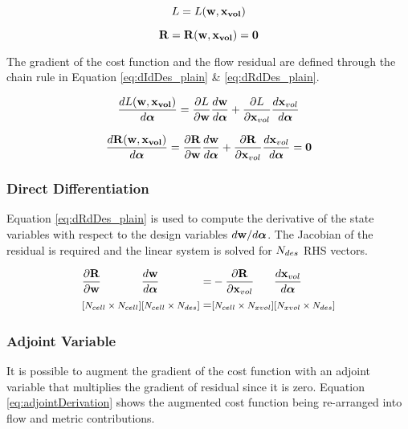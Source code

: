 \documentclass[letterpaper,12pt,]{article}
\begin{document}
\begin{equation}
	L = L(\mathbf{w}, \mathbf{x_{vol}})
	\label{eq:cost}
\end{equation}

\begin{equation}
	\mathbf{R} = \mathbf{R}(\mathbf{w}, \mathbf{x_{vol}}) = \mathbf{0}
	\label{eq:flowres}
\end{equation}

The gradient of the cost function and the flow residual are defined through the chain rule in Equation \ref{eq:dIdDes_plain} \& \ref{eq:dRdDes_plain}.

\begin{equation}
	\dfrac{dL( \mathbf{w}, \mathbf{x_{vol}} ) }{d\boldsymbol{\alpha}}
	= 
    \dfrac{\partial L}{\partial\mathbf{w}}
	\dfrac{d\mathbf{w}}{d\boldsymbol{\alpha}}
	+
	\dfrac{\partial L}{\partial\mathbf{x}_{vol}}
	\dfrac{d\mathbf{x}_{vol}}{d\boldsymbol{\alpha}}
	\label{eq:dIdDes_plain}
\end{equation}

\begin{equation}
	\dfrac{d\mathbf{R}( \mathbf{w}, \mathbf{x_{vol}} ) }{d\boldsymbol{\alpha}}
	= 
    \dfrac{\partial\mathbf{R}}{\partial\mathbf{w}}
	\dfrac{d\mathbf{w}}{d\boldsymbol{\alpha}}
	+
	\dfrac{\partial\mathbf{R}}{\partial\mathbf{x}_{vol}}
	\dfrac{d\mathbf{x}_{vol}}{d\boldsymbol{\alpha}}
	=
	\mathbf{0}
	\label{eq:dRdDes_plain}
\end{equation}

\subsubsection*{Direct Differentiation}

Equation \ref{eq:dRdDes_plain} is used to compute the derivative of the state variables with respect to the design variables ${d\mathbf{w}}/{d\boldsymbol{\alpha}}$.
The Jacobian of the residual is required and the linear system is solved for $N_{des}$ RHS vectors.

\begin{equation}
\begin{alignedat}{5}
	&\dfrac{\partial\mathbf{R}}{\partial\mathbf{w}}
	&&\dfrac{d\mathbf{w}}{d\boldsymbol{\alpha}}
	&&=
    &&-
	\dfrac{\partial\mathbf{R}}{\partial\mathbf{x}_{vol}}
	&&\dfrac{d\mathbf{x}_{vol}}{d\boldsymbol{\alpha}}
	\\
	& \text{\footnotesize$\left[ N_{cell} \times N_{cell} \right]$}
	&& \text{\footnotesize$\left[ N_{cell} \times N_{des} \right]$}
	&&=
	&& \text{\footnotesize$\left[ N_{cell} \times N_{xvol} \right]$}
	&& \text{\footnotesize$\left[ N_{xvol} \times N_{des} \right]$}
	\label{eq:dWdDes}
\end{alignedat}
\end{equation}


\subsubsection*{Adjoint Variable}

It is possible to augment the gradient of the cost function with an adjoint variable that multiplies the gradient of residual since it is zero.
Equation \ref{eq:adjointDerivation} shows the augmented cost function being re-arranged into flow and metric contributions.
\end{document}

